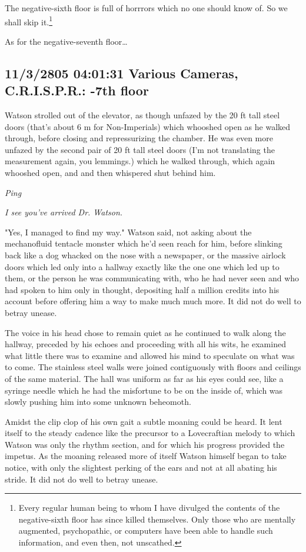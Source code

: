 \documentclass[12pt]{article}
\begin{document}
The negative-sixth floor is full of horrrors which no one should know of. So we shall skip it.\footnote{Every regular human being to whom I have divulged the contents of the negative-sixth floor has since killed themselves. Only those who are mentally augmented, psychopathic, or computers have been able to handle such information, and even then, not unscathed.}

As for the negative-seventh floor\ldots{}

\subsection*{11/3/2805 04:01:31 Various Cameras, C.R.I.S.P.R.: -7th floor}
\label{sec:orgd14b553}

Watson strolled out of the elevator, as though unfazed by the 20 ft tall steel doors (that's about 6 m for Non-Imperials) which whooshed open as he walked through, before closing and repressurizing the chamber. He was even more unfazed by the second pair of 20 ft tall steel doors (I'm not translating the measurement again, you lemmings.) which he walked through, which again whooshed open, and and then whispered shut behind him.

\emph{Ping}

\emph{I see you've arrived Dr. Watson.}

"Yes, I managed to find my way." Watson said, not asking about the mechanofluid tentacle monster which he'd seen reach for him, before slinking back like a dog whacked on the nose with a newspaper, or the massive airlock doors which led only into a hallway exactly like the one one which led up to them, or the person he was communicating with, who he had never seen and who had spoken to him only in thought, depositing half a million credits into his account before offering him a way to make much much more. It did not do well to betray unease.

The voice in his head chose to remain quiet as he continued to walk along the hallway, preceded by his echoes and proceeding with all his wits, he examined what little there was to examine and allowed his mind to speculate on what was to come. The stainless steel walls were joined contiguously with floors and ceilings of the same material. The hall was uniform as far as his eyes could see, like a syringe needle which he had the misfortune to be on the inside of, which was slowly pushing him into some unknown beheomoth.

Amidst the clip clop of his own gait a subtle moaning could be heard. It lent itself to the steady cadence like the precursor to a Lovecraftian melody to which Watson was only the rhythm section, and for which his progress provided the impetus. As the moaning released more of itself Watson himself began to take notice, with only the slightest perking of the ears and not at all abating his stride. It did not do well to betray unease.
\end{document}
